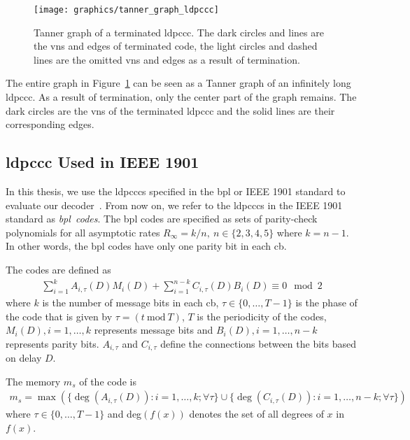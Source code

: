 \begin{figure}[htbp]
  \centering
  \texttt{[image: graphics/tanner\_graph\_ldpccc]}
  \caption[Tanner graph of a terminated \gls{ldpccc}.]{Tanner graph of a terminated \gls{ldpccc}. The dark circles and lines are the \glspl{vn} and edges of terminated code, the light circles and dashed lines are the omitted \glspl{vn} and edges as a result of termination.}
  \label{fig:tannGraphLdpccc}
\end{figure}

The entire graph in Figure~\ref{fig:tannGraphLdpccc} can be seen as a Tanner graph of an infinitely long \gls{ldpccc}. As a result of termination, only the center part of the graph remains. The dark circles are the \glspl{vn} of the terminated \gls{ldpccc} and the solid lines are their corresponding edges.

\subsection{\texorpdfstring{\acrlong{ldpccc}}{LDPC-CC} Used in IEEE 1901}\label{sec:bpl_bg}
In this thesis, we use the \glspl{ldpccc} specified in the \gls{bpl} or IEEE 1901 standard to evaluate our decoder~\cite{Bpl}. From now on, we refer to the \glspl{ldpccc} in the IEEE 1901 standard as \emph{\gls{bpl}~codes}. The \gls{bpl} codes are specified as sets of parity-check polynomials for all asymptotic rates $R_\infty=k/n,\ n\in\{2,3,4,5\}$ where $k=n-1$. In other words, the \gls{bpl} codes have only one parity bit in each \gls{cb}. 

The codes are defined as
\begin{align}\label{eq:bpl_poly}
\sum_{i=1}^{k}A_{i,\tau}(D)M_i(D)+\sum_{i=1}^{n-k}C_{i,\tau}(D)B_i(D)\equiv 0\mod 2
\end{align}
where $k$ is the number of message bits in each \gls{cb}, $\tau \in \{0,\dots,T-1\}$ is the phase of the code that is given by $\tau=(t\ \text{mod}\ T)$, $T$ is the periodicity of the codes, $M_i(D),i=1,\dots,k$ represents message bits and $B_i(D),i=1,\dots,n-k$ represents parity bits. $A_{i,\tau}$ and $C_{i,\tau}$ define the connections between the bits based on delay $D$.

The memory $m_s$ of the code is
\begin{align}
m_s=\max\left(\{\deg(A_{i,\tau}(D)):i=1,\dots,k;\forall\tau\}\cup\{\deg(C_{i,\tau}(D)):i=1,\dots,n-k;\forall\tau\}\right)
\end{align}
where $\tau \in \{0,\dots,T-1\}$ and deg$(f(x))$ denotes the set of all degrees of $x$ in $f(x)$.

